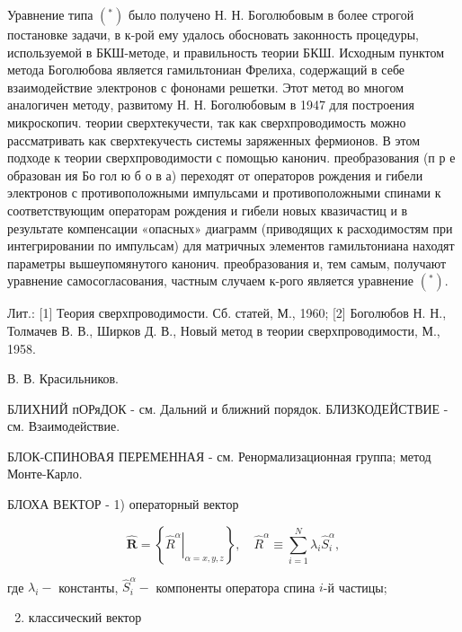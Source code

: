 \documentclass[10pt]{article}
\begin{document}
Уравнение типа $\left({ }^{*}\right)$ было получено Н. Н. Боголюбовым в более строгой постановке задачи, в к-рой ему удалось обосновать законность процедуры, используемой в БКШ-методе, и правильность теории БКШ. Исходным пунктом метода Боголюбова является гамильтониан Фрелиха, содержащий в себе взаимодействие электронов с фононами решетки. Этот метод во многом аналогичен методу, развитому Н. Н. Боголюбовым в 1947 для построения микроскопич. теории сверхтекучести, так как сверхпроводимость можно рассматривать как сверхтекучесть системы заряженных фермионов. В этом подходе к теории сверхпроводимости с помощью канонич. преобразования (п р е образован ия Бо гол ю б о в а) переходят от операторов рождения и гибели электронов с противоположными импульсами и противоположными спинами к соответствующим операторам рождения и гибели новых квазичастиц и в результате компенсации «опасных» диаграмм (приводящих к расходимостям при интегрировании по импульсам) для матричных элементов гамильтониана находят параметры вышеупомянутого канонич. преобразования и, тем самым, получают уравнение самосогласования, частным случаем к-рого является уравнение $\left({ }^{*}\right)$.



Лит.: [1] Теория сверхпроводимости. Сб. статей, М., 1960; [2] Боголюбов Н. Н., Толмачев В. В., Ширков Д. В., Новый метод в теории сверхпроводимости, М., 1958.



В. В. Красильников.



БЛИХНИЙ пОРяДОК - см. Дальний и ближний порядок. БЛИЗКОДЕЙСТВИЕ - см. Взаимодействие.



БЛОК-СПИНОВАЯ ПЕРЕМЕННАЯ - см. Ренормализационная группа; метод Монте-Карло.



БЛОХА ВЕКТОР - 1) операторный вектор



\[

\hat{\boldsymbol{R}}=\left\{\left.\hat{R}^{\alpha}\right|_{\alpha=x, y, z}\right\}, \quad \hat{R}^{\alpha} \equiv \sum_{i=1}^{N} \lambda_{i} \hat{S}_{i}^{\alpha},

\]



где $\lambda_{i}-$ константы, $\hat{S}_{i}^{\alpha}-$ компоненты оператора спина $i$-й частицы;



\begin{enumerate}

  \setcounter{enumi}{1}

  \item классический вектор

\end{enumerate}
\end{document}
